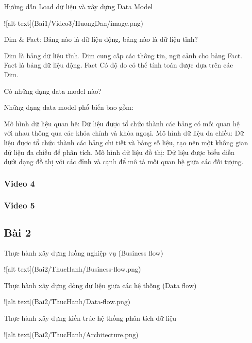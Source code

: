 \documentclass{article}
\begin{document}
\caption{Hướng dẫn Load dữ liệu và xây dựng Data Model }
![alt text](Bai1/Video3/HuongDan/image.png)




Dim & Fact: Bảng nào là dữ liệu động, bảng nào là dữ liệu tĩnh?

Dim là bảng dữ liệu tĩnh. Dim cung cấp các thông tin, ngữ cảnh cho bảng Fact.
Fact là bảng dữ liệu động. Fact Có độ đo có thể tính toán được dựa trên các Dim.

Có những dạng data model nào?

Những dạng data model phổ biến bao gồm:

Mô hình dữ liệu quan hệ: Dữ liệu được tổ chức thành các bảng có mối quan hệ với nhau thông qua các khóa chính và khóa ngoại.
Mô hình dữ liệu đa chiều: Dữ liệu được tổ chức thành các bảng chi tiết và bảng số liệu, tạo nên một không gian dữ liệu đa chiều để phân tích.
Mô hình dữ liệu đồ thị: Dữ liệu được biểu diễn dưới dạng đồ thị với các đỉnh và cạnh để mô tả mối quan hệ giữa các đối tượng.

\subsubsection{Video 4}

\subsubsection{Video 5}

\subsection{Bài 2}

\caption{Thực hành xây dựng luồng nghiệp vụ (Business flow)}
![alt text](Bai2/ThucHanh/Business-flow.png)
\caption{Thực hành xây dựng dòng dữ liệu giữa các hệ thống (Data flow)}
![alt text](Bai2/ThucHanh/Data-flow.png)
\caption{Thực hành xây dựng kiến trúc hệ thống phân tích dữ liệu}
![alt text](Bai2/ThucHanh/Architecture.png)

\end{document}
